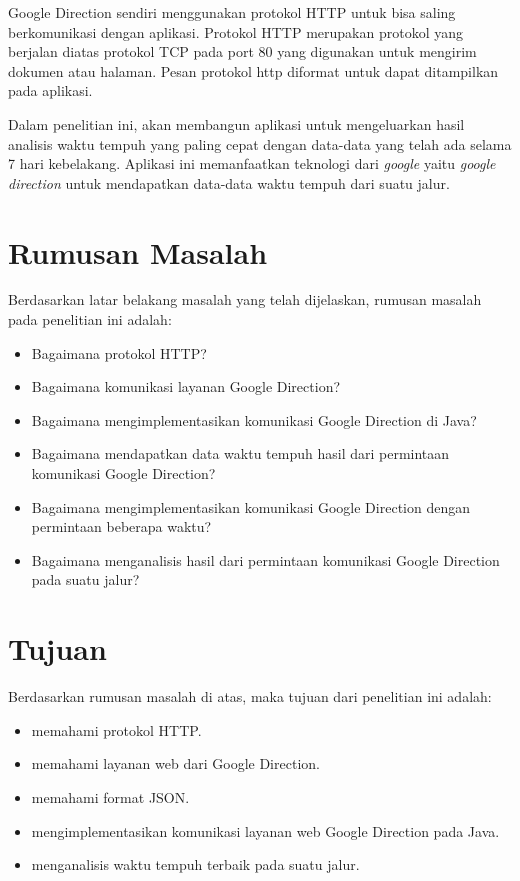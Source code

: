 Google Direction sendiri menggunakan protokol HTTP untuk bisa saling berkomunikasi dengan aplikasi. Protokol HTTP merupakan protokol yang berjalan diatas protokol TCP pada port 80 yang digunakan untuk mengirim dokumen atau halaman. Pesan protokol http diformat untuk dapat ditampilkan pada aplikasi.

Dalam penelitian ini, akan membangun aplikasi untuk mengeluarkan hasil analisis waktu tempuh yang paling cepat dengan data-data yang telah ada selama 7 hari kebelakang. Aplikasi ini memanfaatkan teknologi dari \textit{google} yaitu \textit{google direction} untuk mendapatkan data-data waktu tempuh dari suatu jalur.

\section{Rumusan Masalah}
\label{sec:rumusan}
Berdasarkan latar belakang masalah yang telah dijelaskan, rumusan masalah pada penelitian ini adalah:
\begin{itemize}
	\item Bagaimana protokol HTTP?
	\item Bagaimana komunikasi layanan Google Direction?
	\item Bagaimana mengimplementasikan komunikasi Google Direction di Java?
	\item Bagaimana mendapatkan data waktu tempuh hasil dari permintaan komunikasi Google Direction?
	\item Bagaimana mengimplementasikan komunikasi Google Direction dengan permintaan beberapa waktu?
	\item Bagaimana menganalisis hasil dari permintaan komunikasi Google Direction pada suatu jalur?
\end{itemize}

\section{Tujuan}
\label{sec:tujuan}
Berdasarkan rumusan masalah di atas, maka tujuan dari penelitian ini adalah:
\begin{itemize}
	\item memahami protokol HTTP.
	\item memahami layanan web dari Google Direction.
	\item memahami format JSON.
	\item mengimplementasikan komunikasi layanan web Google Direction pada Java.
	\item menganalisis waktu tempuh terbaik pada suatu jalur.
\end{itemize}

